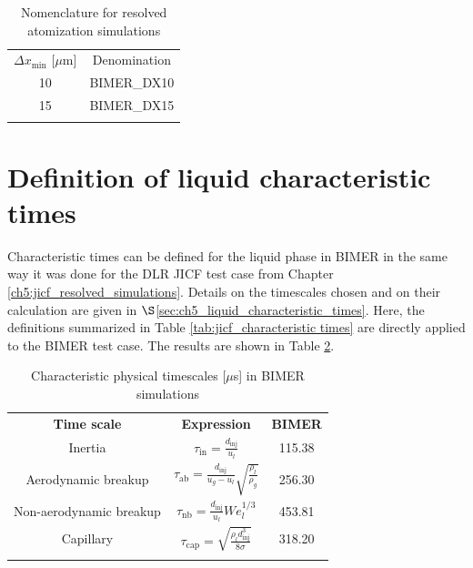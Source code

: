 \begin{table}[!h]
\centering
\caption{Nomenclature for resolved atomization simulations}
\begin{tabular}{cc}
\thickhline
$\Delta x_\mathrm{min}$ [$\mu$m]  &  Denomination \\ 
\thickhline
10 & BIMER\_DX10 \\
15 & BIMER\_DX15 \\
\thickhline
\end{tabular}
\label{tab:BIMER_resolved_simulations_performed}
\end{table}




\section{Definition of liquid characteristic times}

Characteristic times can be defined for the liquid phase in BIMER in the same way it was done for the DLR JICF test case from Chapter \ref{ch5:jicf_resolved_simulations}. Details on the timescales chosen and on their calculation are given in $\S$\ref{sec:ch5_liquid_characteristic_times}. Here, the definitions summarized in Table \ref{tab:jicf_characteristic times} are directly applied to the BIMER test case. The results are shown in Table \ref{tab:BIMER_SPS_characteristic times}. 

\begin{table}[!h]
\centering
\caption{Characteristic physical timescales [$\mu$s] in BIMER simulations}
\begin{tabular}{ccc}
\thickhline
\textbf{Time scale} & \textbf{Expression} & \textbf{BIMER} \\
\thickhline
Inertia & $\tau_\mathrm{in} = \frac{d_\mathrm{inj}}{u_l}$ & 115.38 \\
Aerodynamic breakup  &  $\tau_\mathrm{ab} =  \frac{d_\mathrm{inj}}{u_g - u_l} \sqrt{\frac{\rho_l}{\rho_g}} $ & 256.30 \\
Non-aerodynamic breakup  &  $\tau_\mathrm{nb} = \frac{d_\mathrm{inj}}{u_l} We_l^{1/3} $ &  453.81 \\
Capillary & $\tau_\mathrm{cap} = \sqrt{\frac{\rho_l d_\mathrm{inj}^3}{8 \sigma}}$ & 318.20 \\
\thickhline
\end{tabular}
\label{tab:BIMER_SPS_characteristic times}
\end{table} 

